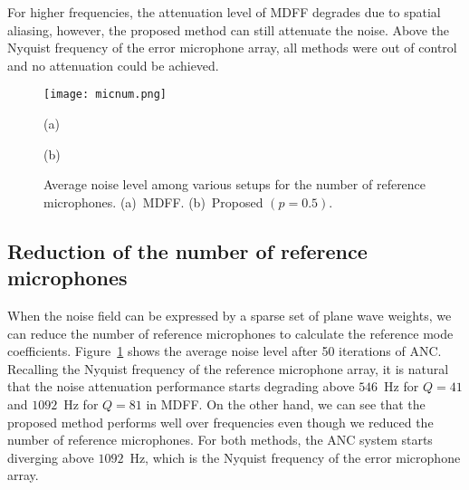 \documentclass{article}
\begin{document}
For higher frequencies, the attenuation level of MDFF degrades due to spatial aliasing,
however, the proposed method can still attenuate the noise.
Above the Nyquist frequency of the error microphone array,
all methods were out of control and no attenuation could be achieved.

%
\begin{figure}[t]
\vspace*{-10pt}
  \centering
  \centerline{\texttt{[image: micnum.png]}}
\begin{minipage}{0.49\linewidth}
\centering
(a)
\end{minipage}
\begin{minipage}{0.49\linewidth}
\centering
(b)
\end{minipage}
\caption{Average noise level among various setups for the number of reference microphones. (a)~MDFF. (b)~Proposed $(p=0.5)$.}
\label{fig:micnum}
\vspace{-3pt}
\end{figure}
%

%
%


\subsection{Reduction of the number of reference microphones}

When the noise field can be expressed by a sparse set of plane wave weights,
we can reduce the number of reference microphones to calculate the reference mode coefficients.
Figure~\ref{fig:micnum} shows the average noise level after 50 iterations of ANC.
Recalling the Nyquist frequency of the reference microphone array,
it is natural that the noise attenuation performance starts degrading
above $546$~Hz for $Q=41$ and $1092$~Hz for $Q=81$ in MDFF.
On the other hand, we can see that the proposed method performs well over frequencies
even though we reduced the number of reference microphones.
For both methods, the ANC system starts diverging above $1092$~Hz, which is the Nyquist frequency of the error microphone array.
\end{document}
